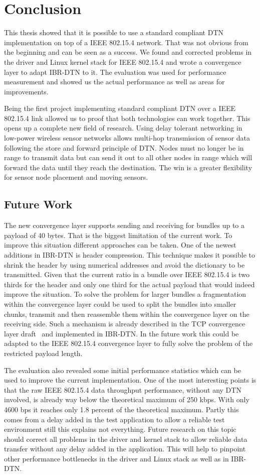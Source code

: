 \chapter{Conclusion}
This thesis showed that it is possible to use a standard compliant DTN
implementation on top of a IEEE 802.15.4 network. That was not obvious from the
beginning and can be seen as a success. We found and corrected problems in the
driver and Linux kernel stack for IEEE 802.15.4 and wrote a convergence layer to
adapt IBR-DTN to it. The evaluation was used for performance measurement and
showed us the actual performance as well as areas for improvements.

Being the first project implementing standard compliant DTN over a IEEE 802.15.4
link allowed us to proof that both technologies can work together. This opens up
a complete new field of research. Using delay tolerant networking in low-power
wireless sensor networks allows multi-hop transmission of sensor data following
the store and forward principle of DTN. Nodes must no longer be in range to
transmit data but can send it out to all other nodes in range which will forward
the data until they reach the destination. The win is a greater flexibility for
sensor node placement and moving sensors.

\section{Future Work}
The new convergence layer supports sending and receiving for bundles up to a
payload of 40 bytes. That is the biggest limitation of the current work. To
improve this situation different approaches can be taken. One of the newest
additions in IBR-DTN is header compression. This technique makes it possible to
shrink the header by using numerical addresses and avoid the dictionary to be
transmitted. Given that the current ratio in a bundle over IEEE 802.15.4 is two
thirds for the header and only one third for the actual payload that would indeed
improve the situation. To solve the problem for larger bundles a fragmentation
within the convergence layer could be used to split the bundles into smaller
chunks, transmit and then reassemble them within the convergence layer on the
receiving side. Such a mechanism is already described in the TCP convergence
layer draft~\cite{tcp-clayer-draft} and implemented in IBR-DTN. In the future
work this could be adapted to the IEEE 802.15.4 convergence layer to fully
solve the problem of the restricted payload length.

The evaluation also revealed some initial performance statistics which can be
used to improve the current implementation. One of the most interesting points
is that the raw IEEE 802.15.4 data throughput performance, without any DTN
involved, is already way below the theoretical maximum of 250 kbps. With only
4600 bps it reaches only 1.8 percent of the theoretical maximum. Partly this
comes from a delay added in the test application to allow a reliable test
environment still this explains not everything. Future research on this topic
should correct all problems in the driver and kernel stack to allow reliable
data transfer without any delay added in the application. This will help to
pinpoint other performance bottlenecks in the driver and Linux stack as well as
in IBR-DTN.
